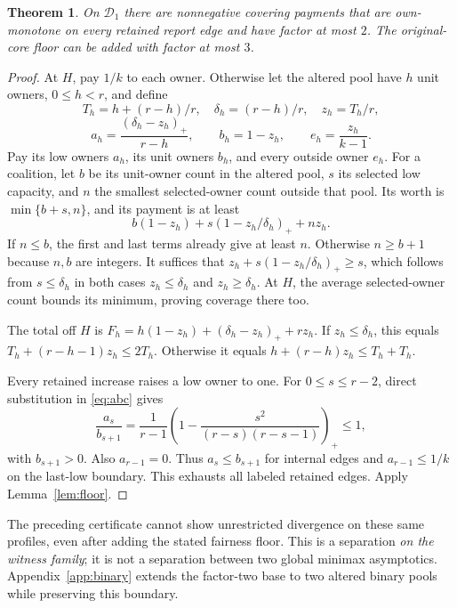 \documentclass[11pt]{article}
\newtheorem{theorem}{Theorem}[section]
\theoremstyle{definition}\newtheorem{definition}[theorem]{Definition}
\theoremstyle{remark}\newtheorem{remark}[theorem]{Remark}
\begin{document}
\begin{theorem}\label{thm:escape}
On $\mathcal D_1$ there are nonnegative covering payments that are own-monotone
on every retained report edge and have factor at most $2$. The original-core
floor can be added with factor at most $3$.
\end{theorem}
\begin{proof}
At $H$, pay $1/k$ to each owner. Otherwise let the altered pool have $h$
unit owners, $0\le h<r$, and define
\[
 T_h=h+(r-h)/r,\quad \delta_h=(r-h)/r,\quad z_h=T_h/r,
\]
\begin{equation}\label{eq:abc}
 a_h=\frac{(\delta_h-z_h)_+}{r-h},\qquad
 b_h=1-z_h,\qquad e_h=\frac{z_h}{k-1}.
\end{equation}
Pay its low owners $a_h$, its unit owners $b_h$, and every outside owner
$e_h$. For a coalition, let $b$ be its unit-owner count in the altered pool,
$s$ its selected low capacity, and $n$ the smallest selected-owner count
outside that pool. Its worth is $\min\{b+s,n\}$, and its payment is at least
\[
 b(1-z_h)+s(1-z_h/\delta_h)_++nz_h.
\]
If $n\le b$, the first and last terms already give at least $n$. Otherwise
$n\ge b+1$ because $n,b$ are integers. It suffices that
$z_h+s(1-z_h/\delta_h)_+\ge s$, which follows from $s\le\delta_h$ in
both cases $z_h\le\delta_h$ and $z_h\ge\delta_h$. At $H$, the average
selected-owner count bounds its minimum, proving coverage there too.

The total off $H$ is
$F_h=h(1-z_h)+(\delta_h-z_h)_++rz_h$.
If $z_h\le\delta_h$, this equals $T_h+(r-h-1)z_h\le2T_h$.
Otherwise it equals $h+(r-h)z_h\le T_h+T_h$.

Every retained increase raises a low owner to one. For $0\le s\le r-2$,
direct substitution in \eqref{eq:abc} gives
\begin{equation}\label{eq:ratio}
 \frac{a_s}{b_{s+1}}=
 \frac1{r-1}\left(1-\frac{s^2}{(r-s)(r-s-1)}\right)_+\le1,
\end{equation}
with $b_{s+1}>0$. Also $a_{r-1}=0$. Thus $a_s\le b_{s+1}$ for internal
edges and $a_{r-1}\le1/k$ on the last-low boundary. This exhausts all labeled
retained edges. Apply Lemma~\ref{lem:floor}.
\end{proof}
The preceding certificate cannot show unrestricted divergence on these same
profiles, even after adding the stated fairness floor. This is a separation
\emph{on the witness family}; it is not a separation between two global
minimax asymptotics. Appendix~\ref{app:binary} extends the factor-two base to
two altered binary pools while preserving this boundary.
\end{document}
